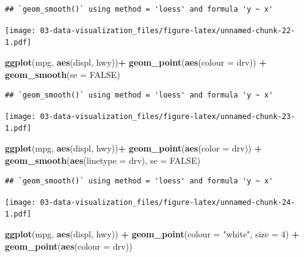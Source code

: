 \documentclass[]{book}
\newenvironment{Shaded}{\begin{snugshade}}{\end{snugshade}}
\newcommand{\DataTypeTok}[1]{\textcolor[rgb]{0.13,0.29,0.53}{#1}}
\newcommand{\DecValTok}[1]{\textcolor[rgb]{0.00,0.00,0.81}{#1}}
\newcommand{\KeywordTok}[1]{\textcolor[rgb]{0.13,0.29,0.53}{\textbf{#1}}}
\newcommand{\NormalTok}[1]{#1}
\newcommand{\OperatorTok}[1]{\textcolor[rgb]{0.81,0.36,0.00}{\textbf{#1}}}
\newcommand{\OtherTok}[1]{\textcolor[rgb]{0.56,0.35,0.01}{#1}}
\newcommand{\StringTok}[1]{\textcolor[rgb]{0.31,0.60,0.02}{#1}}
\theoremstyle{definition}
\theoremstyle{definition}
\theoremstyle{definition}
\theoremstyle{remark}
\begin{document}
\begin{verbatim}
## `geom_smooth()` using method = 'loess' and formula 'y ~ x'
\end{verbatim}

\texttt{[image: 03-data-visualization\_files/figure-latex/unnamed-chunk-22-1.pdf]}

\begin{Shaded}
\begin{Highlighting}[]
\KeywordTok{ggplot}\NormalTok{(mpg, }\KeywordTok{aes}\NormalTok{(displ, hwy))}\OperatorTok{+}
\StringTok{  }\KeywordTok{geom_point}\NormalTok{(}\KeywordTok{aes}\NormalTok{(}\DataTypeTok{colour =}\NormalTok{ drv)) }\OperatorTok{+}
\StringTok{  }\KeywordTok{geom_smooth}\NormalTok{(}\DataTypeTok{se =} \OtherTok{FALSE}\NormalTok{)}
\end{Highlighting}
\end{Shaded}

\begin{verbatim}
## `geom_smooth()` using method = 'loess' and formula 'y ~ x'
\end{verbatim}

\texttt{[image: 03-data-visualization\_files/figure-latex/unnamed-chunk-23-1.pdf]}

\begin{Shaded}
\begin{Highlighting}[]
\KeywordTok{ggplot}\NormalTok{(mpg, }\KeywordTok{aes}\NormalTok{(displ, hwy))}\OperatorTok{+}
\StringTok{  }\KeywordTok{geom_point}\NormalTok{(}\KeywordTok{aes}\NormalTok{(}\DataTypeTok{color =}\NormalTok{ drv)) }\OperatorTok{+}
\StringTok{  }\KeywordTok{geom_smooth}\NormalTok{(}\KeywordTok{aes}\NormalTok{(}\DataTypeTok{linetype =}\NormalTok{ drv), }\DataTypeTok{se =} \OtherTok{FALSE}\NormalTok{)}
\end{Highlighting}
\end{Shaded}

\begin{verbatim}
## `geom_smooth()` using method = 'loess' and formula 'y ~ x'
\end{verbatim}

\texttt{[image: 03-data-visualization\_files/figure-latex/unnamed-chunk-24-1.pdf]}

\begin{Shaded}
\begin{Highlighting}[]
\KeywordTok{ggplot}\NormalTok{(mpg, }\KeywordTok{aes}\NormalTok{(displ, hwy)) }\OperatorTok{+}
\StringTok{  }\KeywordTok{geom_point}\NormalTok{(}\DataTypeTok{colour =} \StringTok{"white"}\NormalTok{, }\DataTypeTok{size =} \DecValTok{4}\NormalTok{) }\OperatorTok{+}
\StringTok{  }\KeywordTok{geom_point}\NormalTok{(}\KeywordTok{aes}\NormalTok{(}\DataTypeTok{colour =}\NormalTok{ drv))}
\end{Highlighting}
\end{Shaded}
\end{document}
